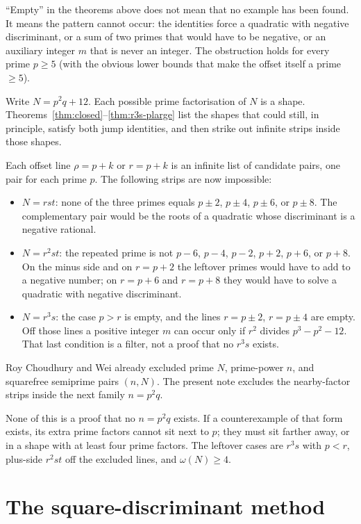 \documentclass[11pt,reqno]{amsart}
\theoremstyle{definition}
\begin{document}
``Empty'' in the theorems above does not mean that no example has been found.
It means the pattern cannot occur: the identities force a quadratic with negative discriminant,
or a sum of two primes that would have to be negative, or an auxiliary integer \(m\) that is never an integer.
The obstruction holds for every prime \(p\ge 5\) (with the obvious lower bounds that make the offset itself a prime \(\ge 5\)).

Write \(N=p^2q+12\). Each possible prime factorisation of \(N\) is a shape.
Theorems~\ref{thm:closed}--\ref{thm:r3s-plarge} list the shapes that could still, in principle, satisfy both jump identities,
and then strike out infinite strips inside those shapes.

Each offset line \(\rho=p+k\) or \(r=p+k\) is an infinite list of candidate pairs, one pair for each prime \(p\).
The following strips are now impossible:
\begin{itemize}
\item \(N=rst\): none of the three primes equals \(p\pm 2\), \(p\pm 4\), \(p\pm 6\), or \(p\pm 8\).
The complementary pair would be the roots of a quadratic whose discriminant is a negative rational.
\item \(N=r^2st\): the repeated prime is not \(p-6\), \(p-4\), \(p-2\), \(p+2\), \(p+6\), or \(p+8\).
On the minus side and on \(r=p+2\) the leftover primes would have to add to a negative number;
on \(r=p+6\) and \(r=p+8\) they would have to solve a quadratic with negative discriminant.
\item \(N=r^3s\): the case \(p>r\) is empty, and the lines \(r=p\pm 2\), \(r=p\pm 4\) are empty.
Off those lines a positive integer \(m\) can occur only if \(r^2\) divides \(p^3-p^2-12\).
That last condition is a filter, not a proof that no \(r^3s\) exists.
\end{itemize}
Roy Choudhury and Wei already excluded prime \(N\), prime-power \(n\), and squarefree semiprime pairs \((n,N)\).
The present note excludes the nearby-factor strips inside the next family \(n=p^2q\).

None of this is a proof that no \(n=p^2q\) exists.
If a counterexample of that form exists, its extra prime factors cannot sit next to \(p\);
they must sit farther away, or in a shape with at least four prime factors.
The leftover cases are \(r^3s\) with \(p<r\), plus-side \(r^2st\) off the excluded lines, and \(\omega(N)\ge 4\).



\section{The square-discriminant method}
\label{sec:sqdisc-reprise}
\end{document}
